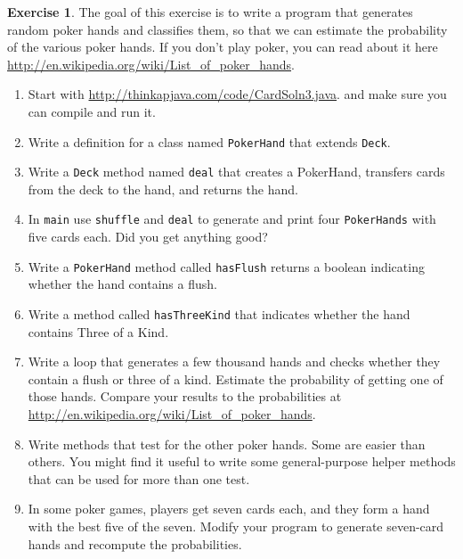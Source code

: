 \documentclass[12pt]{book}
\theoremstyle{definition}
\newtheorem{excz}{Exercise}[chapter]
\newenvironment{exercise}{\bigskip\begin{excz}\mbox{}}{\end{excz}}
\begin{document}
\begin{exercise}
The goal of this exercise is to write a program that generates random
poker hands and classifies them, so that we can estimate the
probability of the various poker hands.  If you don't play poker, you
can read about it here
\url{http://en.wikipedia.org/wiki/List_of_poker_hands}.

\begin{enumerate}

\item Start with \url{http://thinkapjava.com/code/CardSoln3.java}.
and make sure you can compile and run it.

\item Write a definition for a class named {\tt PokerHand}
that extends {\tt Deck}.

\item Write a {\tt Deck} method named {\tt deal} that creates
a PokerHand, transfers cards from the deck to the hand, and returns
the hand.

\item In {\tt main} use {\tt shuffle} and
{\tt deal} to generate and print four {\tt PokerHands} with
five cards each.  Did you get anything good?

\item Write a {\tt PokerHand} method called {\tt hasFlush}
returns a boolean indicating whether the
hand contains a flush.

\item Write a method called {\tt hasThreeKind} that 
indicates whether the hand contains
Three of a Kind.

\item Write a loop that generates a few thousand hands and
checks whether they contain a flush or three of a kind.
Estimate the probability of getting one of those hands.
Compare your results to the probabilities at
\url{http://en.wikipedia.org/wiki/List_of_poker_hands}.

\item Write methods that test for the other poker hands.  Some
are easier than others.  You might find it useful to write some
general-purpose helper methods that can be used for more than one
test.

\item In some poker games, players get seven cards each, and
they form a hand with the best five of the seven.  Modify your
program to generate seven-card hands and recompute the probabilities.

\end{enumerate}
\end{exercise}
\end{document}
